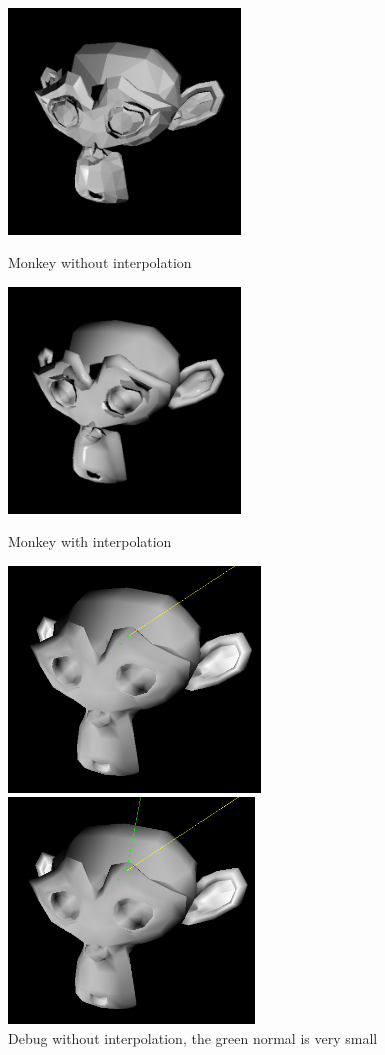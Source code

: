 \documentclass{article}
\begin{document}
    \begin{figure}[!htb]
      \centering
      \captionsetup{justification=centering}
        \includegraphics[width=\linewidth, height=6cm]{images/monke_no_bary}
        \caption*{Monkey without interpolation}
      \endminipage\hfill
        \includegraphics[width=\linewidth, height=6cm]{images/monke_bary}
        \caption*{Monkey with interpolation}
      \endminipage
      \vspace{5mm}
        \includegraphics[width=\linewidth, height=6cm]{images/monke_no_bary_debug}
        \caption*{Debug without interpolation, the green normal is very small}
      \endminipage\hfill
        \includegraphics[width=\linewidth, height=6cm]{images/monke_bary_debug}

\end{figure}
\end{document}
